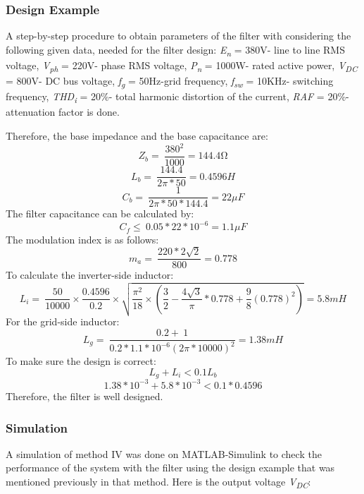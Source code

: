 \documentclass[12pt,a4paper]{book}
\begin{document}
\subsubsection{Design Example}
A step-by-step procedure to obtain parameters of the filter with considering the following given data, needed for the filter design: \emph{E\textsubscript{n}} = 380V- line to line RMS voltage, \emph{V\textsubscript{ph}} = 220V- phase RMS voltage, \emph{P\textsubscript{n}} = 1000W- rated active power, \emph{V\textsubscript{DC}} = 800V- DC bus voltage, \emph{f\textsubscript{g}} = 50Hz-grid frequency, \emph{f\textsubscript{sw}} = 10KHz- switching frequency, \emph{THD\textsubscript{i}} = 20\%- total harmonic distortion of the current, \emph{RAF} = 20\%- attenuation factor is done. 

Therefore, the base impedance and the base capacitance are:
\[Z_{b} = \ \frac{380^{2}}{1000} = 144.4\mathrm{\Omega}\]
\[L_{b} = \ \frac{144.4}{2\pi*50} = 0.4596H\]
\[C_{b} = \ \frac{1}{2\pi*50*144.4} = 22\mu F\]
The filter capacitance can be calculated by:
\[C_{f} \leq \ 0.05*22*10^{- 6} = 1.1\mu F\]
The modulation index is as follows:
\[m_{a} = \ \frac{220*2\sqrt{2}}{800} = 0.778\]
To calculate the inverter-side inductor:
\[L_{i} = \ \frac{50}{10000} \times \frac{0.4596}{0.2} \times \sqrt{\frac{\pi^{2}}{18} \times \left( \frac{3}{2} - \frac{4\sqrt{3}}{\pi}*0.778 + \frac{9}{8}{(0.778)}^{2} \right)} = 5.8mH\]
For the grid-side inductor:
\[L_{g} = \ \frac{0.2 + \ 1}{0.2*1.1*10^{- 6}{(2\pi*10000)}^{2}} = 1.38mH\]
To make sure the design is correct:
\[L_{g} + L_{i} < 0.1L_{b}\]
\[1.38*10^{- 3} + 5.8*10^{- 3} < 0.1*0.4596\]
Therefore, the filter is well designed.

\subsubsection{Simulation}
A simulation of method IV was done on MATLAB-Simulink to check the performance of the system with the filter using the design example that was mentioned previously in that method. Here is the output voltage \emph{V\textsubscript{DC}}:
\end{document}
